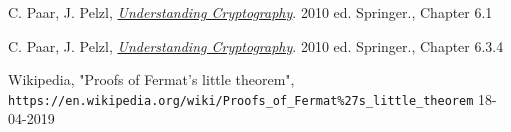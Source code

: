 \documentclass{article}
\begin{document}
	\newpage

	\begin{thebibliography}{99}
		
		C. Paar, J. Pelzl, 
		\textit{\underline{Understanding Cryptography}}. 2010 ed.
		Springer., Chapter 6.1 
		
		C. Paar, J. Pelzl, 
		\textit{\underline{Understanding Cryptography}}. 2010 ed.
		Springer., Chapter 6.3.4 
		
		Wikipedia, "Proofs of Fermat's little theorem",
		\\\texttt{https://en.wikipedia.org/wiki/Proofs\_of\_Fermat\%27s\_little\_theorem} 18-04-2019
		
	\end{thebibliography}
\end{document}
